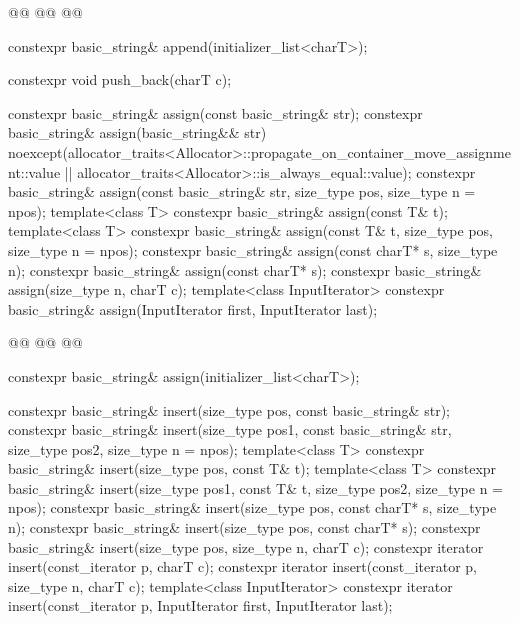 \documentclass{wg21}
\begin{document}
\begin{codeblock}
{{        @@
        @@
        @@

        constexpr basic_string& append(initializer_list<charT>);

        constexpr void push_back(charT c);

        constexpr basic_string& assign(const basic_string& str);
        constexpr basic_string& assign(basic_string&& str)
        noexcept(allocator_traits<Allocator>::propagate_on_container_move_assignment::value ||
        allocator_traits<Allocator>::is_always_equal::value);
        constexpr basic_string& assign(const basic_string& str, size_type pos, size_type n = npos);
        template<class T>
        constexpr basic_string& assign(const T& t);
        template<class T>
        constexpr basic_string& assign(const T& t, size_type pos, size_type n = npos);
        constexpr basic_string& assign(const charT* s, size_type n);
        constexpr basic_string& assign(const charT* s);
        constexpr basic_string& assign(size_type n, charT c);
        template<class InputIterator>
        constexpr basic_string& assign(InputIterator first, InputIterator last);

        @@
        @@
        @@

        constexpr basic_string& assign(initializer_list<charT>);

        constexpr basic_string& insert(size_type pos, const basic_string& str);
        constexpr basic_string& insert(size_type pos1, const basic_string& str,
        size_type pos2, size_type n = npos);
        template<class T>
        constexpr basic_string& insert(size_type pos, const T& t);
        template<class T>
        constexpr basic_string& insert(size_type pos1, const T& t,
        size_type pos2, size_type n = npos);
        constexpr basic_string& insert(size_type pos, const charT* s, size_type n);
        constexpr basic_string& insert(size_type pos, const charT* s);
        constexpr basic_string& insert(size_type pos, size_type n, charT c);
        constexpr iterator insert(const_iterator p, charT c);
        constexpr iterator insert(const_iterator p, size_type n, charT c);
        template<class InputIterator>
        constexpr iterator insert(const_iterator p, InputIterator first, InputIterator last);

}}
\end{codeblock}
\end{document}
